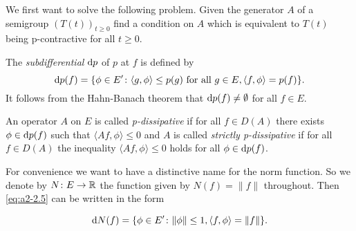 We first want to solve the following problem.
Given the generator $A$ of a semigroup $(T(t))_{t\geq 0}$ find a condition on $A$ which is equivalent to $T(t)$ being p-contractive for all $t \geq 0$.

The \emph{subdifferential} $\mathop{}\!\mathrm{d}{p}$ of $p$ at $f$ is defined by
\begin{equation}\label{eq:a2-2.5}
\mathop{}\!\mathrm{d}{p}(f) = \{\phi \in E' \colon \langle g,\phi \rangle \leq p(g) \text{ for all } g \in E, \langle f,\phi \rangle = p(f) \}.
\end{equation}
It follows from the Hahn-Banach theorem that $\mathop{}\!\mathrm{d}{p}(f) \neq \emptyset$ for all $f \in E$.

\begin{definition}\label{def:a2-2.1}
An operator $A$ on $E$ is called \emph{p-dissipative} if for all $f \in D(A)$ there exists $\phi \in \mathop{}\!\mathrm{d}{p}(f)$ such that $\langle Af,\phi \rangle \leq 0$ 
and $A$ is called \emph{strictly p-dissipative} if for all $f \in D(A)$ the inequality $\langle Af,\phi \rangle \leq 0$ holds for all $\phi \in \mathop{}\!\mathrm{d}{p}(f)$.
\end{definition}
For convenience we want to have a distinctive name for the norm function.
So we denote by $N \colon E \to \mathbb{R}$ the function given by $N(f) = \|f\|$ throughout.
Then \eqref{eq:a2-2.5}   can be written in the form

\begin{equation}\label{eq:a2-2.6}
\mathop{}\!\mathrm{d}{N}(f) = \{\phi \in E' \colon \|\phi\|\leq 1, \langle f,\phi \rangle = \|f\|\}.
\end{equation}

